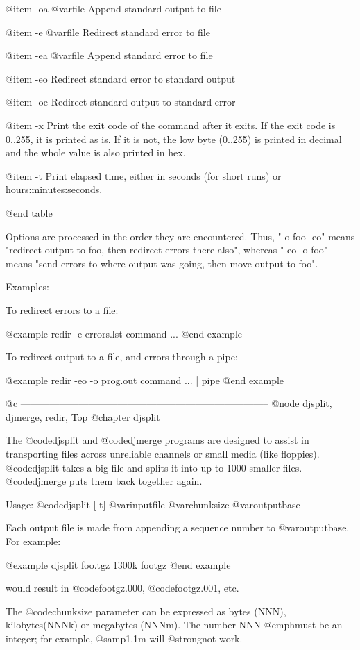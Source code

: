 @item -oa @var{file}
Append standard output to file

@item -e @var{file}
Redirect standard error to file

@item -ea @var{file}
Append standard error to file

@item -eo
Redirect standard error to standard output

@item -oe
Redirect standard output to standard error

@item -x
Print the exit code of the command after it exits.  If the exit code is
0..255, it is printed as is.  If it is not, the low byte (0..255) is
printed in decimal and the whole value is also printed in hex.

@item -t
Print elapsed time, either in seconds (for short runs) or
hours:minutes:seconds.

@end table

Options are processed in the order they are encountered.  Thus, "-o foo
-eo" means "redirect output to foo, then redirect errors there also",
whereas "-eo -o foo" means "send errors to where output was going, then
move output to foo".


Examples:

To redirect errors to a file:

@example
redir -e errors.lst command ...
@end example

To redirect output to a file, and errors through a pipe:

@example
redir -eo -o prog.out command ... | pipe
@end example

@c -----------------------------------------------------------------------------
@node djsplit, djmerge, redir, Top
@chapter djsplit

The @code{djsplit} and @code{djmerge} programs are designed to assist in
transporting files across unreliable channels or small media (like
floppies).  @code{djsplit} takes a big file and splits it into up to 1000
smaller files.  @code{djmerge} puts them back together again.

Usage: @code{djsplit [-t] @var{inputfile} @var{chunksize} @var{outputbase}}

Each output file is made from appending a sequence number to
@var{outputbase}.  For example:

@example
djsplit foo.tgz 1300k footgz
@end example

would result in @code{footgz.000}, @code{footgz.001}, etc.

The @code{chunksize} parameter can be expressed as bytes (NNN),
kilobytes(NNNk) or megabytes (NNNm).  The number NNN @emph{must} be an
integer; for example, @samp{1.1m} will @strong{not} work.

